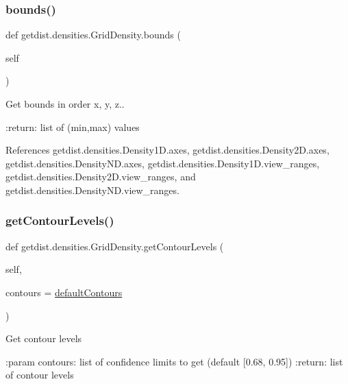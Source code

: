 \subsubsection{\texorpdfstring{bounds()}{bounds()}}
{\footnotesize\ttfamily def getdist.\+densities.\+Grid\+Density.\+bounds (\begin{DoxyParamCaption}\item[{}]{self }\end{DoxyParamCaption})}

\begin{DoxyVerb} Get bounds in order x, y, z..

 :return: list of (min,max) values
\end{DoxyVerb}
 

References getdist.\+densities.\+Density1\+D.\+axes, getdist.\+densities.\+Density2\+D.\+axes, getdist.\+densities.\+Density\+N\+D.\+axes, getdist.\+densities.\+Density1\+D.\+view\+\_\+ranges, getdist.\+densities.\+Density2\+D.\+view\+\_\+ranges, and getdist.\+densities.\+Density\+N\+D.\+view\+\_\+ranges.

\mbox{\label{classgetdist_1_1densities_1_1GridDensity_a33144fef21d2dc029492be256a2e9ee1}} 
\subsubsection{\texorpdfstring{get\+Contour\+Levels()}{getContourLevels()}}
{\footnotesize\ttfamily def getdist.\+densities.\+Grid\+Density.\+get\+Contour\+Levels (\begin{DoxyParamCaption}\item[{}]{self,  }\item[{}]{contours = {\ttfamily \mbox{\hyperlink{namespacegetdist_1_1densities_a93d19accaa564f6252d80ae48a40ae3b}{default\+Contours}}} }\end{DoxyParamCaption})}

\begin{DoxyVerb}Get contour levels

:param contours: list of confidence limits to get (default [0.68, 0.95])
:return: list of contour levels
\end{DoxyVerb}
 

